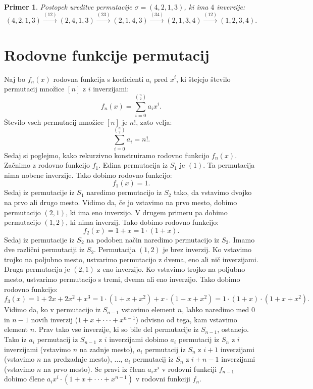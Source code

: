 \documentclass[a4paper, 12pt]{book}
\newtheorem{primer}{Primer}[chapter]
\begin{document}
\begin{primer}
    Postopek ureditve permutacije $\sigma = (4, 2, 1, 3)$, ki ima $4$ inverzije: 
    \[
        (4, 2, 1, 3) \overset{(12)}{\rightarrow} (2, 4, 1, 3) \overset{(23)}{\rightarrow} (2, 1, 4, 3) \overset{(34)}{\rightarrow} (2, 1, 3, 4) \overset{(12)}{\rightarrow} (1, 2, 3, 4).
    \]
\end{primer}

\section{ Rodovne funkcije permutacij }
Naj bo $f_n(x)$ rodovna funkcija s koeficienti $a_i$ pred $x^i$, ki štejejo število permutacij množice $[n]$ z $i$ inverzijami:
\[
    f_n(x) = \sum_{i=0}^{\binom{n}{2}} a_i x^i.
\]
Število vseh permutacij množice $[n]$ je $n!$, zato velja:
\[
    \sum_{i=0}^{\binom{n}{2}} a_i = n! .
\]
Sedaj si poglejmo, kako rekurzivno konstruiramo rodovno funkcijo $f_n(x)$. Začnimo z rodovno funkcijo $f_1$. Edina permutacija iz $S_1$ je $(1)$. Ta permutacija nima nobene inverzije. Tako dobimo rodovno funkcijo:
\[
    f_1(x) = 1.
\]
Sedaj iz permutacije iz $S_1$ naredimo permutacijo iz $S_2$ tako, da vstavimo dvojko na prvo ali drugo mesto. Vidimo da, če jo vstavimo na prvo mesto, dobimo permutacijo $(2, 1)$, ki ima eno inverzijo. V drugem primeru pa dobimo permutacijo $(1, 2)$, ki nima inverzij. Tako dobimo rodovno funkcijo:
\[
    f_2(x) = 1 + x = 1 \cdot (1 + x).
\]
Sedaj iz permutacije iz $S_2$ na podoben način naredimo permutacijo iz $S_3$. Imamo dve različni permutaciji iz $S_2$. Permutacija $(1, 2)$ je brez inverzij. Ko vstavimo trojko na poljubno mesto, ustvarimo permutacijo z dvema, eno ali nič inverzijami. Druga permutacija je $(2, 1)$ z eno inverzijo. Ko vstavimo trojko na poljubno mesto, ustvarimo permutacijo s tremi, dvema ali eno inverzijo. Tako dobimo rodovno funkcijo:
\[
    f_3(x) = 1 + 2x + 2x^2 + x^3 = 1 \cdot (1 + x + x^2) + x \cdot (1 + x + x^2) = 1 \cdot (1 + x) \cdot (1 + x + x^2).
\]
Vidimo da, ko v permutacijo iz $S_{n-1}$ vstavimo element $n$, lahko naredimo med $0$ in $n-1$ novih inverzij ($1 + x + \cdot\cdot\cdot + x^{n-1}$) odvisno od tega, kam vstavimo element $n$. Prav tako vse inverzije, ki so bile del permutacije iz $S_{n-1}$, ostanejo. Tako iz $a_i$ permutacij iz $S_{n-1}$ z $i$ inverzijami dobimo $a_i$ permutacij iz $S_n$ z $i$ inverzijami (vstavimo $n$ na zadnje mesto), $a_i$ permutacij iz $S_n$ z $i+1$ inverzijami (vstavimo $n$ na predzadnje mesto), ..., $a_i$ permutacij iz $S_n$ z $i+n-1$ inverzijami (vstavimo $n$ na prvo mesto). Se pravi iz člena $a_i x^i$ v rodovni funkciji $f_{n-1}$ dobimo člene $a_i x^i \cdot (1 + x + \cdot\cdot\cdot + x^{n-1})$ v rodovni funkciji $f_n$.
\end{document}
